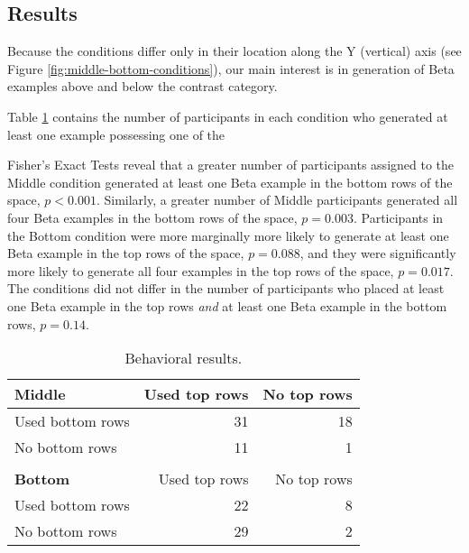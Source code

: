 \documentclass[10pt,letterpaper]{article}
\begin{document}


\subsection{Results}

Because the conditions differ only in their location along the Y (vertical) axis (see Figure \ref{fig:middle-bottom-conditions}), our main interest is in generation of Beta examples above and below the contrast category. 

Table \ref{table:subset-table} contains the number of participants in each condition who generated at least one example possessing one of the 


Fisher's Exact Tests reveal that a greater number of participants assigned to the Middle condition generated at least one Beta example in the bottom rows of the space, $p < 0.001$. Similarly, a greater number of Middle participants generated all four Beta examples in the bottom rows of the space, $p = 0.003$. Participants in the Bottom condition were more marginally more likely to generate at least one Beta example in the top rows of the space, $p = 0.088$, and they were significantly more likely to generate all four examples in the top rows of the space, $p = 0.017$. The conditions did not differ in the number of participants who placed at least one Beta example in the top rows \textit{and} at least one Beta example in the bottom rows, $p = 0.14$.

\begin{table}[!ht]
\begin{center} 
\caption{Behavioral results.} 
\label{table:subset-table} 
\vskip 0.12in
\begin{tabular}{ l r r}
    \textbf{Middle}         & Used top rows & No top rows \\
    \hline
    Used bottom rows        &  31 & 18  \\
    No bottom rows          &  11 &  1  \\
    \\
    \textbf{Bottom}         & Used top rows & No top rows \\
    \hline
    Used bottom rows        & 22 & 8 \\
    No bottom rows          & 29 & 2 \\
\end{tabular}
\end{center} 
\end{table}
\end{document}
